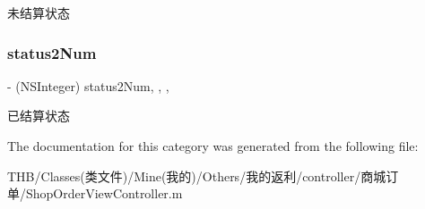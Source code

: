 未结算状态 \mbox{\label{category_shop_order_view_controller_07_08_a478fff73f8202148fcfb249b17104c5f}} 
\subsubsection{\texorpdfstring{status2\+Num}{status2Num}}
{\footnotesize\ttfamily -\/ (N\+S\+Integer) status2\+Num\hspace{0.3cm}{\ttfamily [read]}, {\ttfamily [write]}, {\ttfamily [nonatomic]}, {\ttfamily [assign]}}

已结算状态 

The documentation for this category was generated from the following file\+:\begin{DoxyCompactItemize}
\item 
T\+H\+B/\+Classes(类文件)/\+Mine(我的)/\+Others/我的返利/controller/商城订单/Shop\+Order\+View\+Controller.\+m\end{DoxyCompactItemize}
